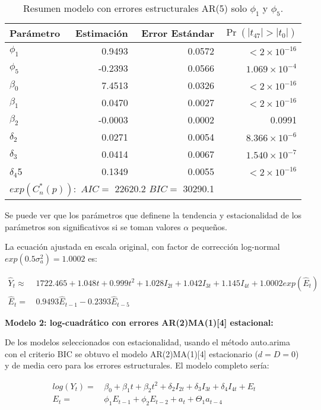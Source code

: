 \documentclass[11pt, letterpaper, twoside]{article}
\begin{document}
\begin{table}
\caption{Resumen modelo con errores estructurales AR(5) solo $\phi_1$ y $\phi_5$.}
\label{tab:mod1_ar5}
\centering
\begin{tabular}{lrrr}
Parámetro & Estimación & Error Estándar & $\Pr(|t_{47}| > |t_0|)$ \\
  \hline
  $\phi_1$ & 0.9493 & 0.0572 & $< 2\times10^{-16}$ \\
    $\phi_5$ & -0.2393 & 0.0566 & $1.069\times10^{-4}$ \\
$\beta_0$ & 7.4513 & 0.0326 & $< 2\times10^{-16}$ \\
 $\beta_1$ & 0.0470 & 0.0027 &  $< 2\times10^{-16}$\\
 $\beta_2$ & -0.0003 & 0.0002 & 0.0991 \\
  $\delta_2$  & 0.0271 & 0.0054 & $8.366\times10^{-6}$ \\
  $\delta_3$ & 0.0414 & 0.0067 & $1.540\times10^{-7}$ \\
 $\delta_4$5 & 0.1349 & 0.0055 & $< 2\times10^{-16}$ \\
   \hline
   \multicolumn{3}{l}{$exp(C_n^*(p)):$ $AIC=$ 22620.2 $BIC=$ 30290.1} & \\
    \hline
\end{tabular}
\end{table}

Se puede ver que los parámetros que definene la tendencia y estacionalidad de los parámetros son significativos si se toman valores $\alpha$ pequeños.

La ecuación ajustada en escala original, con factor de corrección log-normal $exp(0.5 \sigma_a^2)=1.0002$ es:

\begin{align}
\label{eq:mod1_ar5_aju}
    \hat{Y}_t \approx & \, 1722.465 + 1.048 t + 0.999 t^2 + 1.028 I_{2t} + 1.042 I_{3t} + 1.145 I_{4t} + 1.0002 exp(\hat{E}_t)\\
    \hat{E}_t = & \, 0.9493 \hat{E}_{t-1} - 0.2393 \hat{E}_{t-5} \nonumber
\end{align}

\textbf{Modelo 2: log-cuadrático con errores AR(2)MA(1)[4] estacional:}

De los modelos seleccionados con estacionalidad, usando el método auto.arima  con el criterio BIC se obtuvo el modelo AR(2)MA(1)[4] estacionario ($d=D=0$) y de media cero para los errores estructurales. El modelo completo sería:

\begin{align}
\label{eq:mod2_ar2ma1s}
    log(Y_t) = & \, \beta_0 + \beta_1 t + \beta_2 t^2 + \delta_2 I_{2t} + \delta_3 I_{3t} + \delta_4 I_{4t} + E_t \\
    E_t = &\, \phi_1 E_{t-1} + \phi_2 E_{t-2} + a_t + \Theta_1 a_{t-4} \nonumber
\end{align}
\end{document}
